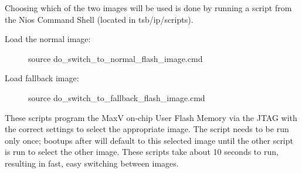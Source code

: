 Choosing which of the two images will be used is done by running a script from the Nios Command Shell (located in tsb/ip/scripts).

\begin{description}
\item [Load the normal image:] source do\_switch\_to\_normal\_flash\_image.cmd
\item [Load fallback image:] source do\_switch\_to\_fallback\_flash\_image.cmd
\end{description}

These scripts program the MaxV on-chip User Flash Memory via the JTAG with the correct settings to select the appropriate image. The script needs to be run only once; bootups after will default to this selected image until the other script is run to select the other image. These scripts take about 10 seconds to run, resulting in fast, easy switching between images.





